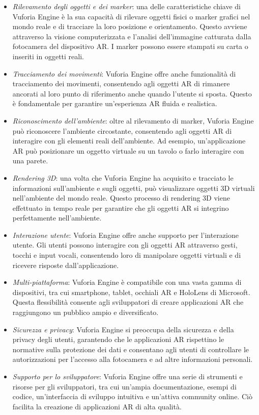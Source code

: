 \begin{itemize}
    \item \textit{Rilevamento degli oggetti e dei marker}: una delle caratteristiche chiave di Vuforia Engine è la sua capacità di rilevare oggetti fisici o marker grafici nel mondo reale e di tracciare la loro posizione e orientamento. Questo avviene attraverso la visione computerizzata e l'analisi dell'immagine catturata dalla fotocamera del dispositivo AR. I marker possono essere stampati su carta o inseriti in oggetti reali. 
    \item \textit{Tracciamento dei movimenti}: Vuforia Engine offre anche funzionalità di tracciamento dei movimenti, consentendo agli oggetti AR di rimanere ancorati al loro punto di riferimento anche quando l'utente si sposta. Questo è fondamentale per garantire un'esperienza AR fluida e realistica. 
    \item \textit{Riconoscimento dell'ambiente}: oltre al rilevamento di marker, Vuforia Engine può riconoscere l'ambiente circostante, consentendo agli oggetti AR di interagire con gli elementi reali dell'ambiente. Ad esempio, un'applicazione AR può posizionare un oggetto virtuale su un tavolo o farlo interagire con una parete.
    \item \textit{Rendering 3D}: una volta che Vuforia Engine ha acquisito e tracciato le informazioni sull'ambiente e sugli oggetti, può visualizzare oggetti 3D virtuali nell'ambiente del mondo reale. Questo processo di rendering 3D viene effettuato in tempo reale per garantire che gli oggetti AR si integrino perfettamente nell'ambiente. 
    \item \textit{Interazione utente}: Vuforia Engine offre anche supporto per l'interazione utente. Gli utenti possono interagire con gli oggetti AR attraverso gesti, tocchi e input vocali, consentendo loro di manipolare oggetti virtuali e di ricevere risposte dall'applicazione. 
    \item \textit{Multi-piattaforma}: Vuforia Engine è compatibile con una vasta gamma di dispositivi, tra cui smartphone, tablet, occhiali AR e HoloLens di Microsoft. Questa flessibilità consente agli sviluppatori di creare applicazioni AR che raggiungono un pubblico ampio e diversificato. 
    \item \textit{Sicurezza e privacy}: Vuforia Engine si preoccupa della sicurezza e della privacy degli utenti, garantendo che le applicazioni AR rispettino le normative sulla protezione dei dati e consentano agli utenti di controllare le autorizzazioni per l'accesso alla fotocamera e ad altre informazioni personali. 
    \item \textit{Supporto per lo sviluppatore}: Vuforia Engine offre una serie di strumenti e risorse per gli sviluppatori, tra cui un'ampia documentazione, esempi di codice, un'interfaccia di sviluppo intuitiva e un'attiva community online. Ciò facilita la creazione di applicazioni AR di alta qualità.
\end{itemize}

